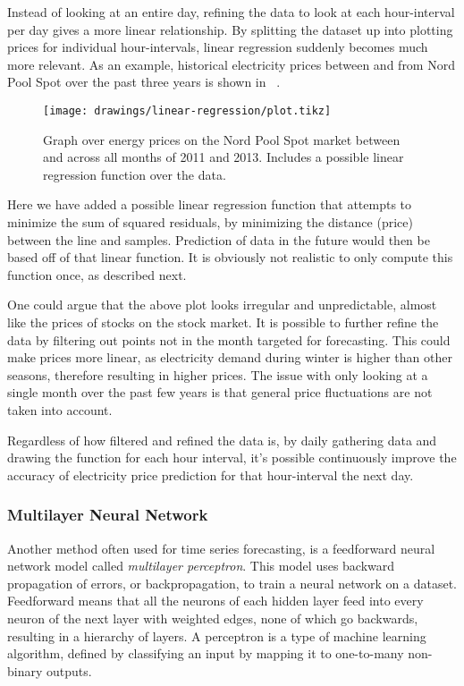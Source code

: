 Instead of looking at an entire day, refining the data to look at each hour-interval per day gives a more linear relationship. By splitting the dataset up into plotting prices for individual hour-intervals, linear regression suddenly becomes much more relevant. As an example, historical electricity prices between  and  from Nord Pool Spot over the past three years is shown in ~\cite{nordPoolSpot}.

\begin{figure}[htpb]
  \centering
  \texttt{[image: drawings/linear-regression/plot.tikz]}
  \caption{Graph over energy prices on the Nord Pool Spot market between  and  across all months of 2011 and 2013. Includes a possible linear regression function over the data.}
  \label{fig:energyprices}
\end{figure}

Here we have added a possible linear regression function that attempts to minimize the sum of squared residuals, by minimizing the distance (price) between the line and samples. Prediction of data in the future would then be based off of that linear function. It is obviously not realistic to only compute this function once, as described next.

One could argue that the above plot looks irregular and unpredictable, almost like the prices of stocks on the stock market. It is possible to further refine the data by filtering out points not in the month targeted for forecasting. This could make prices more linear, as electricity demand during winter is higher than other seasons, therefore resulting in higher prices. The issue with only looking at a single month over the past few years is that general price fluctuations are not taken into account.

Regardless of how filtered and refined the data is, by daily gathering data and drawing the function for each hour interval, it's possible continuously improve the accuracy of electricity price prediction for that hour-interval the next day.

\subsubsection{Multilayer Neural Network}
Another method often used for time series forecasting, is a feedforward neural network model called \emph{multilayer perceptron}. This model uses backward propagation of errors, or backpropagation, to train a neural network on a dataset. Feedforward means that all the neurons of each hidden layer feed into every neuron of the next layer with weighted edges, none of which go backwards, resulting in a hierarchy of layers. A perceptron is a type of machine learning algorithm, defined by classifying an input by mapping it to one-to-many non-binary outputs.

